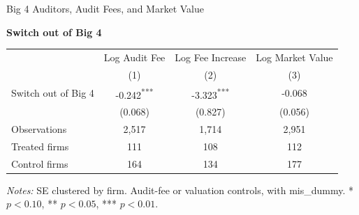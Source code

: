 \documentclass[10pt]{article}
\newcommand{\sym}[1]{\textsuperscript{#1}}
\begin{document}
\fontsize{10}{12}\selectfont
\setlength{\tabcolsep}{3pt}\renewcommand{\arraystretch}{1.15}
\begin{center}\large Big 4 Auditors, Audit Fees, and Market Value\end{center}
\medskip\textbf{Switch out of Big 4}\par\smallskip
\begin{tabular*}{\textwidth}{@{\extracolsep{\fill}}lccc@{}}
\toprule
 & Log Audit Fee & Log Fee Increase & Log Market Value \\
 & (1) & (2) & (3) \\
\midrule
Switch out of Big 4 & -0.242\sym{***} & -3.323\sym{***} & -0.068 \\
 & (0.068) & (0.827) & (0.056) \\
Observations & 2,517 & 1,714 & 2,951 \\
Treated firms & 111 & 108 & 112 \\
Control firms & 164 & 134 & 177 \\
\bottomrule\end{tabular*}\par
\medskip\fontsize{9}{11}\selectfont\textit{Notes:} SE clustered by firm. Audit-fee or valuation controls, with mis\_dummy. * $p<0.10$, ** $p<0.05$, *** $p<0.01$.
\end{document}
